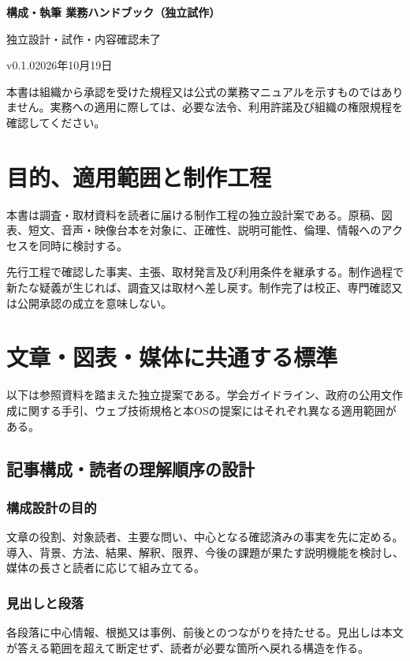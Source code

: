 \documentclass[a4paper,11pt]{article}
\begin{document}
\begin{center}
{\Large\bfseries 構成・執筆 業務ハンドブック（独立試作）}\par\medskip
{\small 独立設計・試作・内容確認未了}\par
{\small v0.1.0\quad 2026年10月19日}\par
\end{center}
\vspace{6mm}
\noindent 本書は組織から承認を受けた規程又は公式の業務マニュアルを示すものではありません。実務への適用に際しては、必要な法令、利用許諾及び組織の権限規程を確認してください。\par
\tableofcontents
\clearpage
\section{目的、適用範囲と制作工程}
\par 本書は調査・取材資料を読者に届ける制作工程の独立設計案である。原稿、図表、短文、音声・映像台本を対象に、正確性、説明可能性、倫理、情報へのアクセスを同時に検討する。\par\medskip
\par 先行工程で確認した事実、主張、取材発言及び利用条件を継承する。制作過程で新たな疑義が生じれば、調査又は取材へ差し戻す。制作完了は校正、専門確認又は公開承認の成立を意味しない。\par\medskip
\section{文章・図表・媒体に共通する標準}
\par 以下は参照資料を踏まえた独立提案である。学会ガイドライン、政府の公用文作成に関する手引、ウェブ技術規格と本OSの提案にはそれぞれ異なる適用範囲がある。\par\medskip
\subsection{記事構成・読者の理解順序の設計}
\subsubsection{構成設計の目的}
\par 文章の役割、対象読者、主要な問い、中心となる確認済みの事実を先に定める。導入、背景、方法、結果、解釈、限界、今後の課題が果たす説明機能を検討し、媒体の長さと読者に応じて組み立てる。\par\medskip
\subsubsection{見出しと段落}
\par 各段落に中心情報、根拠又は事例、前後とのつながりを持たせる。見出しは本文が答える範囲を超えて断定せず、読者が必要な箇所へ戻れる構造を作る。\par\medskip
\end{document}
